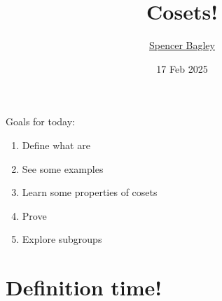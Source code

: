 \documentclass[8pt, handout]{beamer}
\title[Cosets!]{Cosets!}
\author[\href{mailto:sbagley@westminsteru.edu}{S. Bagley}]
       {\href{mailto:sbagley@westminsteru.edu}{Spencer Bagley}}
\institute[Westminster] { 
  \normalsize With many thanks to Matthew Macauley, \\
  \url{http://www.math.clemson.edu/~macaule/}}
\date[17 Feb 2025]{17 Feb 2025}
\begin{document}
\frame{\titlepage}


\begin{frame}{Goals for today:}
  \begin{enumerate}
    \item Define what  are
    \item See some examples 
    \item Learn some properties of cosets
    \item Prove 
    \item Explore  subgroups
  \end{enumerate}
\end{frame}


\section{Definition time!}
\end{document}
